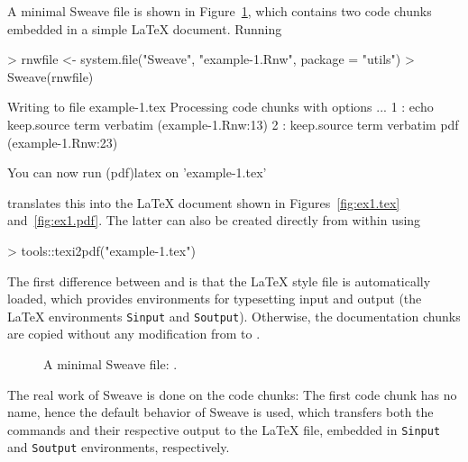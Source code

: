 \documentclass[a4paper]{article}
\begin{document}
A minimal Sweave file is shown in Figure~\ref{fig:ex1.Rnw}, which
contains two code chunks embedded in a simple \LaTeX{}
document. Running
\begin{Schunk}
\begin{Sinput}
> rnwfile <- system.file("Sweave", "example-1.Rnw", package = "utils")
> Sweave(rnwfile)
\end{Sinput}
\begin{Soutput}
Writing to file example-1.tex
Processing code chunks with options ...
 1 : echo keep.source term verbatim (example-1.Rnw:13)
 2 : keep.source term verbatim pdf  (example-1.Rnw:23)

You can now run (pdf)latex on 'example-1.tex'
\end{Soutput}
\end{Schunk}
translates this into the \LaTeX{} document shown in
Figures~\ref{fig:ex1.tex} and~\ref{fig:ex1.pdf}. The latter can also
be created directly from within \R{} using
\begin{Schunk}
\begin{Sinput}
> tools::texi2pdf("example-1.tex")
\end{Sinput}
\end{Schunk}

The first difference between  and
 is that the \LaTeX{} style file
 is automatically loaded, which provides
environments for typesetting \R{} input and output (the \LaTeX{}
environments \texttt{Sinput} and \texttt{Soutput}). Otherwise, the
documentation chunks are copied without any modification from
 to .

\begin{figure}[htbp]
  \centering
  \begin{minipage}{0.9\textwidth}
    
  \end{minipage}
  \caption{A minimal Sweave file: .}
  \label{fig:ex1.Rnw}
\end{figure}

The real work of Sweave is done on the code chunks: The first code
chunk has no name, hence the default behavior of Sweave is used, which
transfers both the \R{} commands and their respective output to the \LaTeX{}
file, embedded in \texttt{Sinput} and \texttt{Soutput} environments,
respectively.
\end{document}
